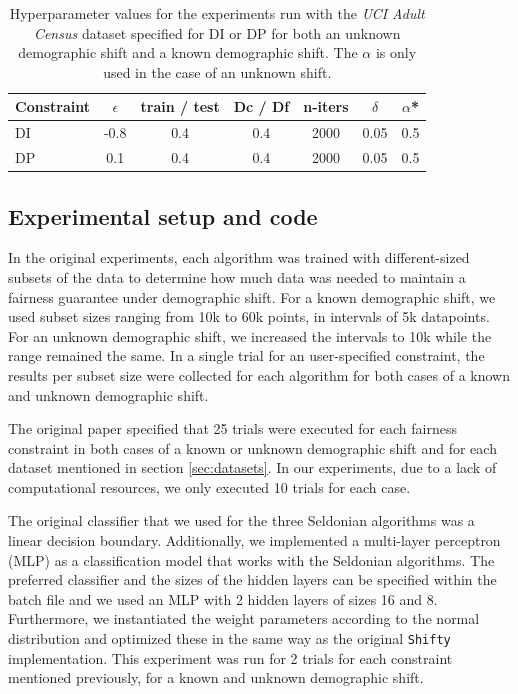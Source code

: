 \begin{table}[ht]
\centering
\footnotesize
    \begin{tabular}{l|c|c|c|c|c|c}
    Constraint & $\epsilon$ & train / test & Dc / Df & n-iters & $\delta$ & $\alpha$* \\\hline 
    DI & -0.8 & 0.4 & 0.4 &  2000 & 0.05 & 0.5\\
    DP & 0.1 & 0.4 & 0.4 & 2000 & 0.05 & 0.5 \\
    \end{tabular}
    \caption{Hyperparameter values for the experiments run with the \textit{UCI Adult Census} dataset specified for DI or DP for both an unknown demographic shift and a known demographic shift. The $\alpha$ is only used in the case of an unknown shift.}
    \label{tab:Adulthyperparams}
\end{table}

\subsection{Experimental setup and code} \label{sec:experiments}
In the original experiments, each algorithm was trained with different-sized subsets of the data to determine how much data was needed to maintain a fairness guarantee under demographic shift. For a known demographic shift, we used subset sizes ranging from 10k to 60k points, in intervals of 5k datapoints. For an unknown demographic shift, we increased the intervals to 10k while the range remained the same. In a single trial for an user-specified constraint, the results per subset size were collected for each algorithm for both cases of a known and unknown demographic shift.

The original paper specified that 25 trials were executed for each fairness constraint in both cases of a known or unknown demographic shift and for each dataset mentioned in section \ref{sec:datasets}. In our experiments, due to a lack of computational resources, we only executed 10 trials for each case.

The original classifier that we used for the three Seldonian algorithms was a linear decision boundary. Additionally, we implemented a multi-layer perceptron (MLP) as a classification model that works with the Seldonian algorithms. The preferred classifier and the sizes of the hidden layers can be specified within the batch file and we used an MLP with 2 hidden layers of sizes 16 and 8. Furthermore, we instantiated the weight parameters according to the normal distribution and optimized these in the same way as the original \texttt{Shifty} implementation. This experiment was run for 2 trials for each constraint mentioned previously, for a known and unknown demographic shift. 

